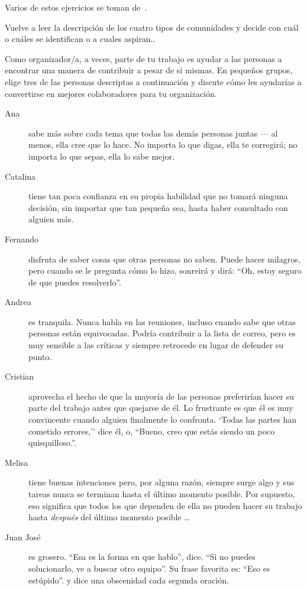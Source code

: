 
Varios de estos ejercicios se toman de~\cite{Brow2007}.


Vuelve a leer la descripción de los cuatro tipos de comunidades
y decide con cuál o cuáles se identifican o a cuales aspiran..


Como organizador/a,
a veces, parte de tu trabajo es ayudar a las personas a encontrar una manera de contribuir a pesar de sí mismas.
En pequeños grupos,
elige tres de las personas descriptas a continuación
y discute cómo les ayudarías a convertirse en mejores colaboradores para tu organización.

\begin{description}

\item[Ana]
  sabe más sobre cada tema que todas las demás personas juntas --- al menos,
  ella cree que lo hace.
  No importa lo que digas,
  ella te corregirá;
  no importa lo que sepas, ella lo sabe mejor.
    
\item[Catalina]
  tiene tan poca confianza en su propia habilidad
  que no tomará ninguna decisión,
  sin importar que tan pequeña sea,
  hasta haber consultado con alguien más.

\item[Fernando]
  disfruta de saber cosas que otras personas no saben.
  Puede hacer milagros,
  pero cuando se le pregunta cómo lo hizo,
  sonreirá y dirá:
  ``Oh, estoy seguro de que puedes resolverlo''.

\item[Andrea]
  es tranquila.
  Nunca habla en las reuniones,
  incluso cuando sabe que otras personas están equivocadas.
  Podría contribuir a la lista de correo,
  pero es muy sensible a las críticas
  y siempre retrocede en lugar de defender su punto.

\item[Cristian]
  aprovecha el hecho de que la mayoría de las personas preferirían hacer su parte del trabajo antes 
  que quejarse de él.
  Lo frustrante es que él es muy convincente cuando alguien finalmente lo confronta.
  `Todas las partes han cometido errores,''
  dice él,
  o, ``Bueno, creo que estás siendo un poco quisquilloso.''.

\item[Melisa]
  tiene buenas intenciones
  pero, por alguna razón, siempre surge algo
  y sus tareas nunca se terminan hasta el último momento posible.
  Por supuesto,
  eso significa que todos los que dependen de ella no pueden hacer su trabajo
  hasta \emph{después} del último momento posible {\ldots}
 
\item[Juan José]
 es grosero.
  ``Esa es la forma en que hablo'', dice.
  ``Si no puedes solucionarlo, ve a buscar otro equipo''.
  Su frase favorita es: ``Eso es estúpido''.
  y dice una obscenidad cada segunda oración.

\end{description}

